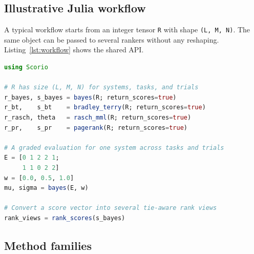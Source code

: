 \documentclass{juliacon}
\newcommand{\scorio}{\texttt{Scorio.jl}}
\begin{document}
\subsection{Illustrative Julia workflow}

A typical workflow starts from an integer tensor \texttt{R} with shape \texttt{(L, M, N)}. The same object can be passed to several rankers without any reshaping. Listing~\ref{lst:workflow} shows the shared API.

\begin{lstlisting}[language=julia,basicstyle=\ttfamily\scriptsize,breaklines=true,breakatwhitespace=false,columns=fullflexible,keepspaces=true,frame=single,showstringspaces=false,caption={Illustrative \scorio{} workflow using the shared tensor interface.},label={lst:workflow}]
using Scorio

# R has size (L, M, N) for systems, tasks, and trials
r_bayes, s_bayes = bayes(R; return_scores=true)
r_bt,    s_bt    = bradley_terry(R; return_scores=true)
r_rasch, theta   = rasch_mml(R; return_scores=true)
r_pr,    s_pr    = pagerank(R; return_scores=true)

# A graded evaluation for one system across tasks and trials
E = [0 1 2 2 1;
     1 1 0 2 2]
w = [0.0, 0.5, 1.0]
mu, sigma = bayes(E, w)

# Convert a score vector into several tie-aware rank views
rank_views = rank_scores(s_bayes)
\end{lstlisting}


\subsection{Method families}
\end{document}
